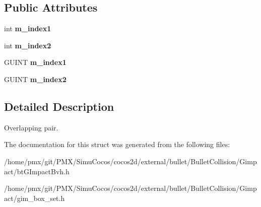 \subsection*{Public Attributes}
\begin{DoxyCompactItemize}
\item 
\mbox{\label{structGIM__PAIR_a6acfeb93e6bcd794c8f3765adfdad962}} 
int {\bfseries m\+\_\+index1}
\item 
\mbox{\label{structGIM__PAIR_a8b9ea4da06cf2f9f55c3c114caac0d91}} 
int {\bfseries m\+\_\+index2}
\item 
\mbox{\label{structGIM__PAIR_a6acfeb93e6bcd794c8f3765adfdad962}} 
G\+U\+I\+NT {\bfseries m\+\_\+index1}
\item 
\mbox{\label{structGIM__PAIR_a8b9ea4da06cf2f9f55c3c114caac0d91}} 
G\+U\+I\+NT {\bfseries m\+\_\+index2}
\end{DoxyCompactItemize}


\subsection{Detailed Description}
Overlapping pair. 

The documentation for this struct was generated from the following files\+:\begin{DoxyCompactItemize}
\item 
/home/pmx/git/\+P\+M\+X/\+Simu\+Cocos/cocos2d/external/bullet/\+Bullet\+Collision/\+Gimpact/bt\+G\+Impact\+Bvh.\+h\item 
/home/pmx/git/\+P\+M\+X/\+Simu\+Cocos/cocos2d/external/bullet/\+Bullet\+Collision/\+Gimpact/gim\+\_\+box\+\_\+set.\+h\end{DoxyCompactItemize}
